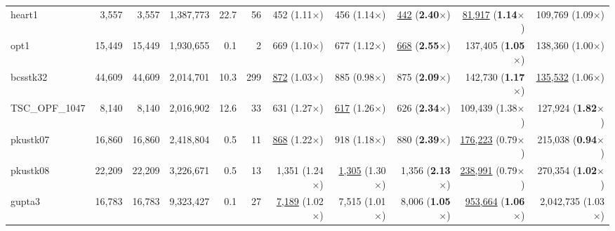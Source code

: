 \begin{table}[t!]
{\begin{tabular}{l|rrrrr|rrr|rr}
    heart1 & 3,557 & 3,557 & 1,387,773 & 22.7 & 56 & 452 (1.11$\times$) & 456 (1.14$\times$) & \underline{442} (\textbf{2.40}$\times$) & \underline{81,917} (\textbf{1.14}$\times$) & 109,769 (1.09$\times$) \\
    opt1 & 15,449 & 15,449 & 1,930,655 & 0.1 & 2 & 669 (1.10$\times$) & 677 (1.12$\times$) & \underline{668} (\textbf{2.55}$\times$) & 137,405 (\textbf{1.05}$\times$) & 138,360 (1.00$\times$) \\
    bcsstk32 & 44,609 & 44,609 & 2,014,701 & 10.3 & 299 & \underline{872} (1.03$\times$) & 885 (0.98$\times$) & 875 (\textbf{2.09}$\times$) & 142,730 (\textbf{1.17}$\times$) & \underline{135,532} (1.06$\times$) \\
    TSC\_OPF\_1047 & 8,140 & 8,140 & 2,016,902 & 12.6 & 33 & 631 (1.27$\times$) & \underline{617} (1.26$\times$) & 626 (\textbf{2.34}$\times$) & 109,439 (1.38$\times$) & 127,924 (\textbf{1.82}$\times$) \\
    pkustk07 & 16,860 & 16,860 & 2,418,804 & 0.5 & 11 & \underline{868} (1.22$\times$) & 918 (1.18$\times$) & 880 (\textbf{2.39}$\times$) & \underline{176,223} (0.79$\times$) & 215,038 (\textbf{0.94}$\times$) \\
    pkustk08 & 22,209 & 22,209 & 3,226,671 & 0.5 & 13 & 1,351 (1.24$\times$) & \underline{1,305} (1.30$\times$) & 1,356 (\textbf{2.13}$\times$) & \underline{238,991} (0.79$\times$) & 270,354 (\textbf{1.02}$\times$) \\
    gupta3 & 16,783 & 16,783 & 9,323,427 & 0.1 & 27 & \underline{7,189} (1.02$\times$) & 7,515 (1.01$\times$) & 8,006 (\textbf{1.05}$\times$) & \underline{953,664} (\textbf{1.06}$\times$) & 2,042,735 (1.03$\times$) \\
    \bottomrule
    \end{tabular}
    }
\end{table}
